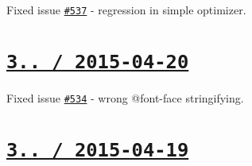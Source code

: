 \begin{DoxyItemize}
\item Fixed issue \href{https://github.com/jakubpawlowicz/clean-css/issues/537}{\tt \#537} -\/ regression in simple optimizer.
\end{DoxyItemize}

\section*{\href{https://github.com/jakubpawlowicz/clean-css/compare/v3.2.0...v3.2.1}{\tt 3.. / 2015-\/04-\/20} }


\begin{DoxyItemize}
\item Fixed issue \href{https://github.com/jakubpawlowicz/clean-css/issues/534}{\tt \#534} -\/ wrong {\ttfamily @font-\/face} stringifying.
\end{DoxyItemize}

\section*{\href{https://github.com/jakubpawlowicz/clean-css/compare/v3.1.9...v3.2.0}{\tt 3.. / 2015-\/04-\/19} }


